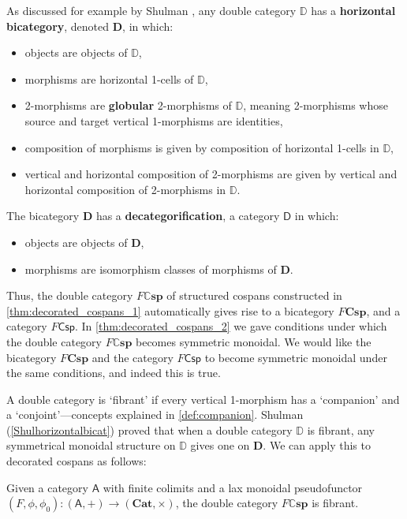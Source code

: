 \documentclass[ a4paper, onecolumn, superscriptaddress,10pt, accepted=2022-02-14, issue=3, volume=4, shorttitle=papers/compositionality-4-3 ]{compositionalityarticle}
\let\maps\colon
\newcommand{\A}{\mathsf{A}}
\newcommand{\D}{\mathsf{D}}
\newcommand{\Csp}{\mathsf{Csp}}
\newcommand{\bicat}{\mathbf}
\newcommand{\bCsp}{\bicat{Csp}}
\newcommand{\bD}{\bicat{D}}
\newcommand{\Cat}{\bicat{Cat}}
\newcommand{\double}[1]{\mathbf{\mathbb #1}}
\newcommand{\lCsp}{\double{Csp}}
\newcommand{\lD}{\double{D}}
\newcommand{\define}[1]{{\rm \textbf{#1}}}
\begin{document}
As discussed for example by Shulman \cite{Shulman2010}, any double category $\lD$ has a
\define{horizontal bicategory}, denoted $\bD$, in which:
\begin{itemize}
\item objects are objects of $\lD$,
\item morphisms are horizontal 1-cells of $\lD$,
\item 2-morphisms are \define{globular} 2-morphisms of $\lD$, meaning 2-morphisms whose source and target vertical 1-morphisms are identities,
\item composition of morphisms is given by composition of horizontal 1-cells in $\lD$,
\item vertical and horizontal composition of 2-morphisms are given by vertical and horizontal
composition of 2-morphisms in $\lD$.
\end{itemize}
The bicategory $\bD$ has a \define{decategorification}, a category $\D$ in which:
\begin{itemize}
\item objects are objects of $\bD$,
\item morphisms are isomorphism classes of morphisms of $\bD$.
\end{itemize}
Thus, the double category $F\lCsp$ of structured cospans constructed in \cref{thm:decorated_cospans_1} automatically gives rise to a bicategory $F\bCsp$, and a category $F\Csp$.   In \cref{thm:decorated_cospans_2} we gave conditions under which the double category $F\lCsp$ becomes symmetric monoidal.   We would like the bicategory $F\bCsp$ and the category $F\Csp$ to become symmetric monoidal under the same conditions, and indeed this is true.

A double category is `fibrant' if every vertical 1-morphism has a `companion' and a `conjoint'---concepts explained in \cref{def:companion}. Shulman (\cref{Shulhorizontalbicat}) proved that when a double category $\lD$ is fibrant, any symmetrical monoidal structure on $\lD$ gives one on $\bD$.    We can apply this to decorated cospans as follows:

\begin{lem}
Given a category $\A$ with finite colimits and a lax monoidal pseudofunctor $(F,\phi,\phi_0) \maps (\A,+)\to(\Cat,\times)$, the double category $F\lCsp$ is fibrant.
\end{lem}
\end{document}
